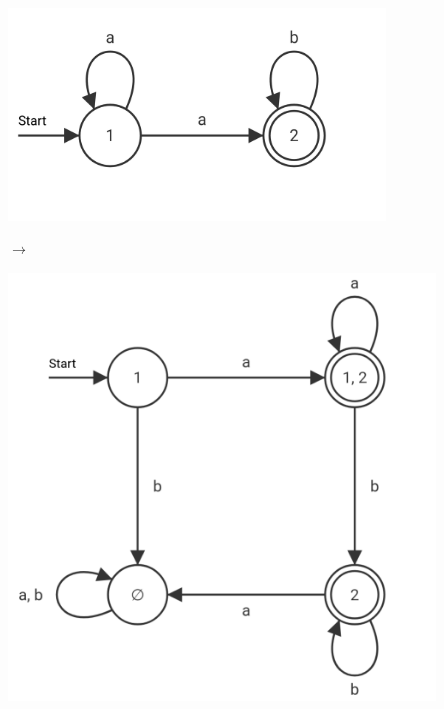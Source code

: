 \documentclass[11pt, a4paper]{scrartcl}
\begin{document}
\begin{minipage}[h]{0.40\textwidth}
    \centering \includegraphics[width=0.75\textwidth]{NEA-01.png}
\end{minipage}
\begin{minipage}[h]{0.10\textwidth}
    \centering $\rightarrow$
\end{minipage}
\begin{minipage}[h]{0.40\textwidth}
    \centering \includegraphics[width=0.85\textwidth]{DEA-01.png}
\end{minipage}

\vspace{0.5em}
\end{document}
